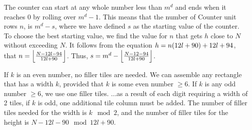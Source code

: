 %
The counter can start at any whole number less than $m^d$ and ends when it reaches 0 by rolling over $m^d - 1$.
%
This means that the number of Counter unit rows $n$, is $m^d - s$, where we have defined $s$ as the starting value of the counter.
%
To choose the best starting value, we find the value for $n$ that gets $h$ close to $N$ without exceeding $N$.
%
It follows from the equation $h = n(\rowheight) + \seedheight$, that $n = \floor*{\frac{N - 12l - 94}{\rowheight}}$.
%
Thus, $s = m^d - \floor*{\frac{N - 12 - 94}{\rowheight}}$.
%

%
If $k$ is an even number, no filler tiles are needed.
%
We can assemble any rectangle that has a width $k$, provided that $k$ is some even number $\geq 6$.
%
If $k$ is any odd number $\geq 6$, we use one filler tiles.
%
...as a result of each digit requiring a width of 2 tiles, if $k$ is odd, one additional tile column must be added.
%
The number of filler tiles needed for the width is $k \mod 2$, and the number of filler tiles for the height is $N - 12l - 90 \mod 12l + 90$.
%

